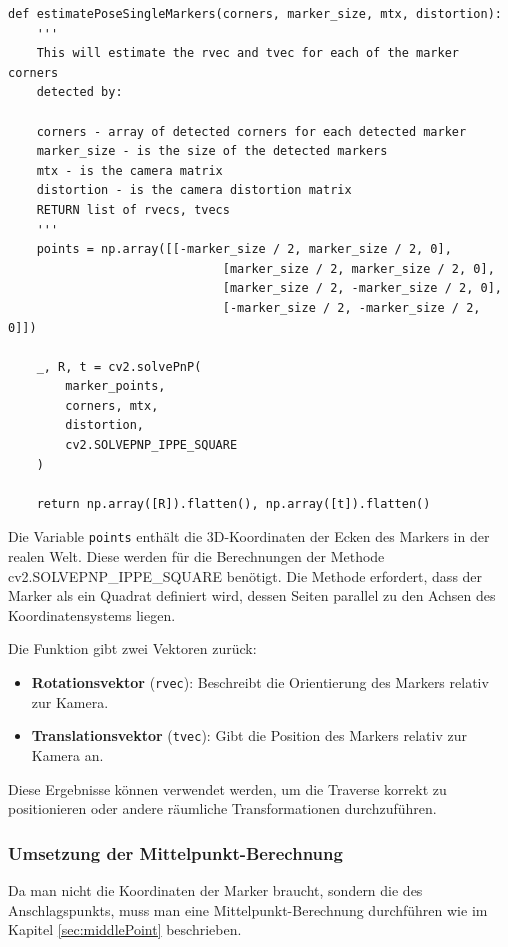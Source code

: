 \begin{lstlisting}
def estimatePoseSingleMarkers(corners, marker_size, mtx, distortion):
    '''
    This will estimate the rvec and tvec for each of the marker corners 
    detected by:

    corners - array of detected corners for each detected marker
    marker_size - is the size of the detected markers
    mtx - is the camera matrix
    distortion - is the camera distortion matrix
    RETURN list of rvecs, tvecs
    '''
    points = np.array([[-marker_size / 2, marker_size / 2, 0],
                              [marker_size / 2, marker_size / 2, 0],
                              [marker_size / 2, -marker_size / 2, 0],
                              [-marker_size / 2, -marker_size / 2, 0]])

    _, R, t = cv2.solvePnP(
        marker_points, 
        corners, mtx, 
        distortion,
        cv2.SOLVEPNP_IPPE_SQUARE
    )
    
    return np.array([R]).flatten(), np.array([t]).flatten()
\end{lstlisting}

Die Variable \texttt{points} enthält die 3D-Koordinaten der Ecken des Markers in der realen Welt. 
Diese werden für die Berechnungen der Methode cv2.SOLVEPNP\_IPPE\_SQUARE benötigt. 
Die Methode erfordert, dass der Marker als ein Quadrat definiert wird, dessen Seiten parallel 
zu den Achsen des Koordinatensystems liegen.

Die Funktion gibt zwei Vektoren zurück:
\begin{itemize}
    \item \textbf{Rotationsvektor} (\texttt{rvec}): Beschreibt die Orientierung des Markers relativ zur Kamera.
    \item \textbf{Translationsvektor} (\texttt{tvec}): Gibt die Position des Markers relativ zur Kamera an.
\end{itemize}

Diese Ergebnisse können verwendet werden, um die Traverse korrekt zu positionieren oder andere 
räumliche Transformationen durchzuführen.


\subsubsection{Umsetzung der Mittelpunkt-Berechnung}

Da man nicht die Koordinaten der Marker braucht, sondern die des Anschlagspunkts, muss man eine Mittelpunkt-Berechnung durchführen wie im Kapitel \ref{sec:middlePoint} beschrieben.

